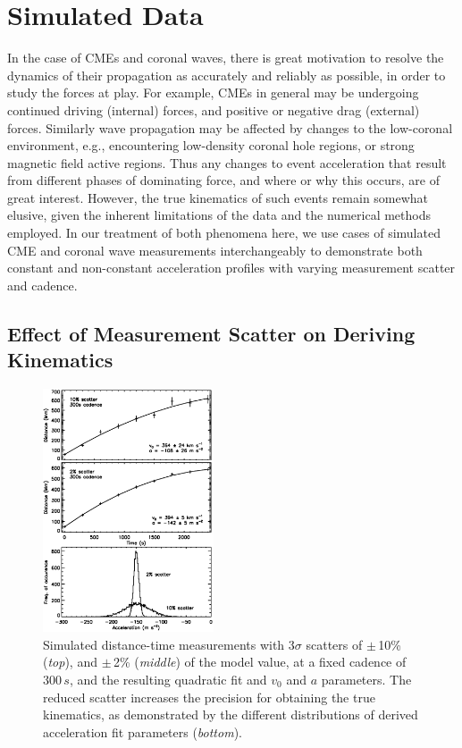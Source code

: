 \documentclass[structabstract]{aa}
\begin{document}
\section{Simulated Data}
\label{sect:simul1}

In the case of CMEs and coronal waves, there is great motivation to resolve the dynamics of their propagation as accurately and reliably as possible, in order to study the forces at play. For example, CMEs in general may be undergoing continued driving (internal) forces, and positive or negative drag (external) forces. Similarly wave propagation may be affected by changes to the low-coronal environment, e.g., encountering low-density coronal hole regions, or strong magnetic field active regions. Thus any changes to event acceleration that result from different phases of dominating force, and where or why this occurs, are of great interest. However, the true kinematics of such events remain somewhat elusive, given the inherent limitations of the data and the numerical methods employed. In our treatment of both phenomena here, we use cases of simulated CME and coronal wave measurements interchangeably to demonstrate both constant and non-constant acceleration profiles with varying measurement scatter and cadence.


\subsection{Effect of Measurement Scatter on Deriving Kinematics}
\label{subsect:noise}

\begin{figure}[!t]
\begin{center}
\includegraphics[width = 0.45\textwidth]{images/noise_hist_jpb.eps}
\caption{Simulated distance-time measurements with 3$\sigma$ scatters of $\pm$\,10\% (\emph{top}), and $\pm$\,2\% (\emph{middle}) of the model value, at a fixed cadence of $300\,s$, and the resulting quadratic fit and $v_0$ and $a$ parameters. The reduced scatter increases the precision for obtaining the true kinematics, as demonstrated by the different distributions of derived acceleration fit parameters (\emph{bottom}).}
\label{noise_hist_weight}
\end{center}
\end{figure}
\end{document}
